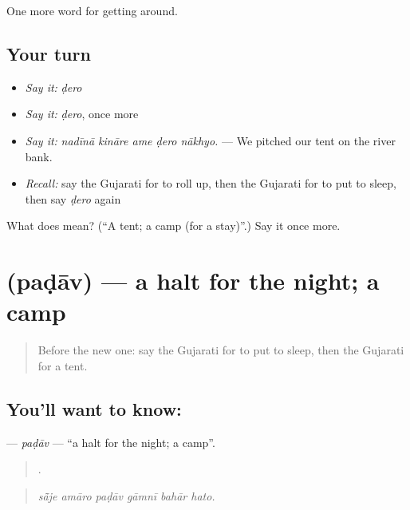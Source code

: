 \begin{grammarlens}[title={What you've built}]
One more word for getting around.
\end{grammarlens}

\subsection*{Your turn}
\begin{itemize}
\raggedright
  \item \emph{Say it:} \emph{ḍero}
  \item \emph{Say it:} \emph{ḍero}, once more
  \item \emph{Say it:} \emph{nadīnā kināre ame ḍero nākhyo.} — We pitched our tent on the river bank.
  \item \emph{Recall:} say the Gujarati for to roll up, then the Gujarati for to put to sleep, then say \emph{ḍero} again
\end{itemize}

\begin{tcolorbox}[breakable,colback=teal!4,colframe=teal!35!black,title={Before you move on}]
What does  mean? (\textquotedblleft{}A tent; a camp (for a stay)\textquotedblright{}.) Say it once more.
\end{tcolorbox}
\section[\texorpdfstring{\gu{પડાવ} (paḍāv)}{પડાવ (paḍāv)}]{ (paḍāv) — a halt for the night; a camp}

\label{lesson:GU-C412-padav}



\begin{quote}
Before the new one: say the Gujarati for to put to sleep, then the Gujarati for a tent.
\end{quote}

\subsection*{You'll want to know: }
\textbf{} — \emph{paḍāv} — \textquotedblleft{}a halt for the night; a camp\textquotedblright{}.

\begin{quote}
     .
\end{quote}

\begin{quote}
\emph{sā̃je amāro paḍāv gāmnī bahār hato.}
\end{quote}

